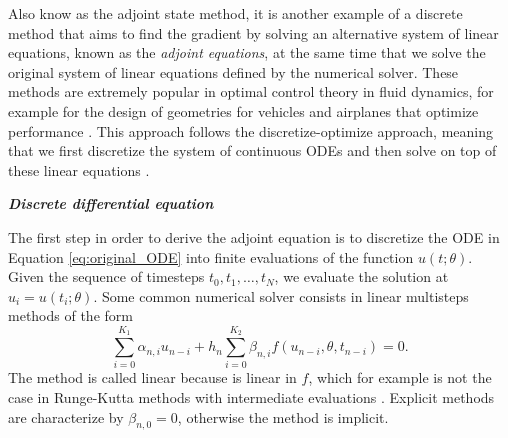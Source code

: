 Also know as the adjoint state method, it is another example of a discrete method that aims to find the gradient by solving an alternative system of linear equations, known as the \textit{adjoint equations}, at the same time that we solve the original system of linear equations defined by the numerical solver. 
These methods are extremely popular in optimal control theory in fluid dynamics, for example for the design of geometries for vehicles and airplanes that optimize performance \cite{Elliott_Peraire_1996, Giles_Pierce_2000}.
This approach follows the discretize-optimize approach, meaning that we first discretize the system of continuous ODEs and then solve on top of these linear equations \cite{Giles_Pierce_2000}. 



\vspace*{10px}
\noindent \textbf{\textit{Discrete differential equation}}
\vspace*{5px}


The first step in order to derive the adjoint equation is to discretize the ODE in Equation \eqref{eq:original_ODE} into finite evaluations of the function $u(t; \theta)$. 
Given the sequence of timesteps $t_0, t_1, \ldots, t_N$, we evaluate the solution at $u_i = u(t_i; \theta)$. 
Some common numerical solver consists in linear multisteps methods of the form 
\begin{equation}
    \sum_{i=0}^{K_1} \alpha_{n,i} u_{n-i} 
    +
    h_n \sum_{i=0}^{K_2} \beta_{n,i} f(u_{n-i}, \theta, t_{n-i})
    = 
    0.
\end{equation}
The method is called linear because is linear in $f$, which for example is not the case in Runge-Kutta methods with intermediate evaluations \cite{ascher2008numerical}.
Explicit methods are characterize by $\beta_{n, 0} = 0$, otherwise the method is implicit. 

